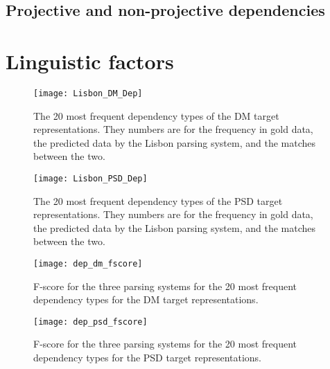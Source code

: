 \subsection{Projective and non-projective dependencies}


\section{Linguistic factors}

\begin{figure}[h]
    \centering
    \begin{minipage}{0.8\textwidth}
        \centering
        \texttt{[image: Lisbon\_DM\_Dep]}
    \end{minipage}\hfill
    \caption{The 20 most frequent dependency types of the DM target representations. They numbers are for the frequency in gold data, the predicted data by the Lisbon parsing system, and the matches between the two.}
    \label{fig:lisbon_dep_1}
\end{figure}

\begin{figure}[h]
    \centering
    \begin{minipage}{0.8\textwidth}
        \centering
        \texttt{[image: Lisbon\_PSD\_Dep]}
    \end{minipage}
    \caption{The 20 most frequent dependency types of the PSD target representations. They numbers are for the frequency in gold data, the predicted data by the Lisbon parsing system, and the matches between the two.}
    \label{fig:lisbon_dep_2}
\end{figure}

\begin{figure}[h]
    \centering
    \begin{minipage}{0.8\textwidth}
        \centering
        \texttt{[image: dep\_dm\_fscore]}
    \end{minipage}\hfill
    \caption{F-score for the three parsing systems for the 20 most frequent dependency types for the DM target representations.}
    \label{fig:dep_fscore_1}
\end{figure}

\begin{figure}[h]
    \centering
    \begin{minipage}{0.8\textwidth}
        \centering
        \texttt{[image: dep\_psd\_fscore]}
    \end{minipage}
    \caption{F-score for the three parsing systems for the 20 most frequent dependency types for the PSD target representations.}
    \label{fig:dep_fscore_2}
\end{figure}

